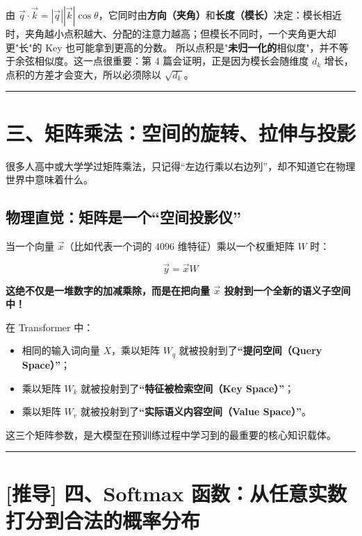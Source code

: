 \begin{warningBox}[避坑指南与核心警示]
由 $\vec{q} \cdot \vec{k} = |\vec{q}| |\vec{k}| \cos\theta$，它同时由\textbf{方向（夹角）}和\textbf{长度（模长）}决定：模长相近时，夹角越小点积越大、分配的注意力越高；但模长不同时，一个夹角更大却更"长"的 Key 也可能拿到更高的分数。
所以点积是"\textbf{未归一化的}相似度"，并不等于余弦相似度。这一点很重要：第 4 篇会证明，正是因为模长会随维度 $d_k$ 增长，点积的方差才会变大，所以必须除以 $\sqrt{d_k}$。
\end{warningBox}

\vspace{0.8em}\hrule\vspace{0.8em}

\section{三、矩阵乘法：空间的旋转、拉伸与投影}

很多人高中或大学学过矩阵乘法，只记得“左边行乘以右边列”，却不知道它在物理世界中意味着什么。

\subsection{物理直觉：矩阵是一个“空间投影仪”}

当一个向量 $\vec{x}$（比如代表一个词的 4096 维特征）乘以一个权重矩阵 $W$ 时：

\[
\vec{y} = \vec{x} W
\]

\textbf{这绝不仅是一堆数字的加减乘除，而是在把向量 $\vec{x}$ 投射到一个全新的语义子空间中！}

在 Transformer 中：
\begin{itemize}
  \item 相同的输入词向量 $X$，乘以矩阵 $W_q$ 就被投射到了\textbf{“提问空间（Query Space）”}；
  \item 乘以矩阵 $W_k$ 就被投射到了\textbf{“特征被检索空间（Key Space）”}；
  \item 乘以矩阵 $W_v$ 就被投射到了\textbf{“实际语义内容空间（Value Space）”}。
\end{itemize}

这三个矩阵参数，是大模型在预训练过程中学习到的最重要的核心知识载体。

\vspace{0.8em}\hrule\vspace{0.8em}

\section{[推导] 四、Softmax 函数：从任意实数打分到合法的概率分布}

